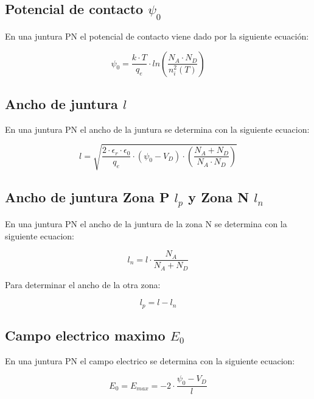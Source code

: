 \documentclass[../main.tex]{subfiles}
\begin{document}
	
	\subsection{Potencial de contacto $\psi_0$}
	
	En una juntura PN el potencial de contacto viene dado por la siguiente ecuación:
	
	\begin{equation}
		\psi_0 = \frac{k \cdot T}{q_e} \cdot ln \left( \frac{N_A \cdot N_D}{n_i^2(T)}\right) 
	\end{equation}
	
	\subsection{Ancho de juntura $l$}
	
	En una juntura PN el ancho de la juntura se determina con la siguiente ecuacion:
	
	\begin{equation}
		l = \sqrt{\frac{2 \cdot \epsilon_r \cdot \epsilon_0}{q_e} \cdot \left( \psi_0 - V_D\right) \cdot \left( \frac{N_A + N_D}{N_A \cdot N_D} \right)  }
	\end{equation}
	
	\subsection{Ancho de juntura Zona P $l_p$ y Zona N $l_n$}
	
	En una juntura PN el ancho de la juntura de la zona N se determina con la siguiente ecuacion:
	
	\begin{equation}
		l_n = l \cdot \frac{N_A}{N_A + N_D}
	\end{equation}
	
	Para determinar el ancho de la otra zona:
	
	\begin{equation}
		l_p = l - l_n
	\end{equation}
	
	\subsection{Campo electrico maximo $E_0$}
	
	En una juntura PN el campo electrico se determina con la siguiente ecuacion:
	
	\begin{equation}
		E_0 = E_{max} = - 2 \cdot \frac{\psi_0 - V_D}{l}
	\end{equation}
	
\end{document}

